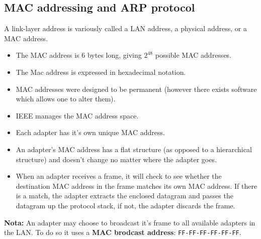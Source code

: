 \clearpage
\subsection[5.4 MAC addressing and ARP protocol]{\hspace*{0.075 em}\raisebox{0.2 em}{$\pmb{\drsh}$} MAC addressing and ARP protocol}
\label{subsec:MAC}

\noindent A link-layer address is variously called a LAN address, a physical address, or a MAC address.

\begin{itemize}
    \item The MAC address is 6 bytes long, giving $2^{48}$ possible MAC addresses. 
    \item The Mac address is expressed in hexadecimal notation.
    \item  MAC addresses were designed to be permanent (however there exists software which allows one to alter them).
    \item IEEE manages the MAC address space. 
    \item Each adapter has it's own unique MAC address.
    \item An adapter’s MAC address has a flat structure (as opposed to a hierarchical structure) and doesn’t change no matter where the adapter goes.
    \item When an adapter receives a frame, it will check to see whether the destination MAC address in the frame matches its own MAC address. If there is a match, the adapter extracts the enclosed datagram and passes the datagram up the protocol stack, if not, the adapter discards the frame.
\end{itemize}

\vspace{1 em}
\noindent\textbf{Nota:}
An adapter may choose to broadcast it's frame to all available adapters in the LAN. To do so it uses a \textbf{MAC brodcast address}: \texttt{FF-FF-FF-FF-FF-FF}.

